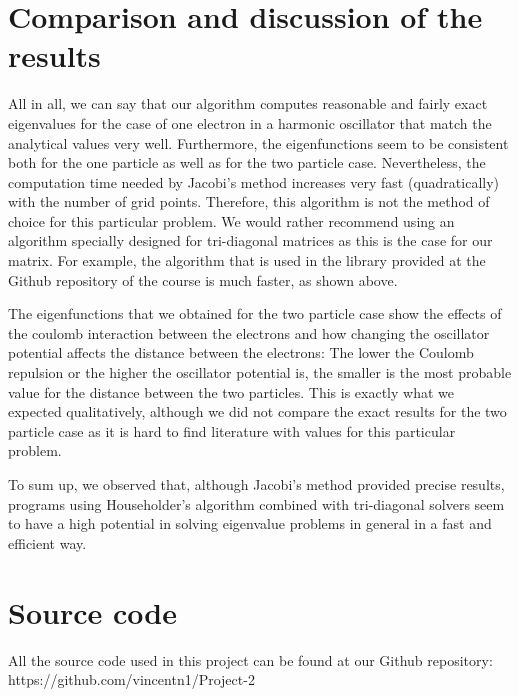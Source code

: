 \documentclass[10pt,a4paper]{article}
\begin{document}
\section{Comparison and discussion of the results} \label{Comparison and results}
All in all, we can say that our algorithm computes reasonable and fairly exact eigenvalues for the case of one electron in a harmonic oscillator that match the analytical values very well. Furthermore, the eigenfunctions seem to be consistent both for the one particle as well as for the two particle case. Nevertheless, the computation time needed by Jacobi's method increases very fast (quadratically) with the number of grid points. Therefore, this algorithm is not the method of choice for this particular problem. We would rather recommend using an algorithm specially designed for tri-diagonal matrices as this is the case for our matrix. For example, the algorithm that is used in the library provided at the Github repository of the course is much faster, as shown above.

The eigenfunctions that we obtained for the two particle case show the effects of the coulomb interaction between the electrons and how changing the oscillator potential affects the distance between the electrons: The lower the Coulomb repulsion or the higher the oscillator potential is, the smaller is the most probable value for the distance between the two particles. This is exactly what we expected qualitatively, although we did not compare the exact results for the two particle case as it is hard to find literature with values for this particular problem.

To sum up, we observed that, although Jacobi's method provided precise results, programs using Householder's algorithm combined with tri-diagonal solvers seem to have a high potential in solving eigenvalue problems in general in a fast and efficient way.
\section{Source code}
All the source code used in this project can be found at our Github repository: https://github.com/vincentn1/Project-2
\end{document}
